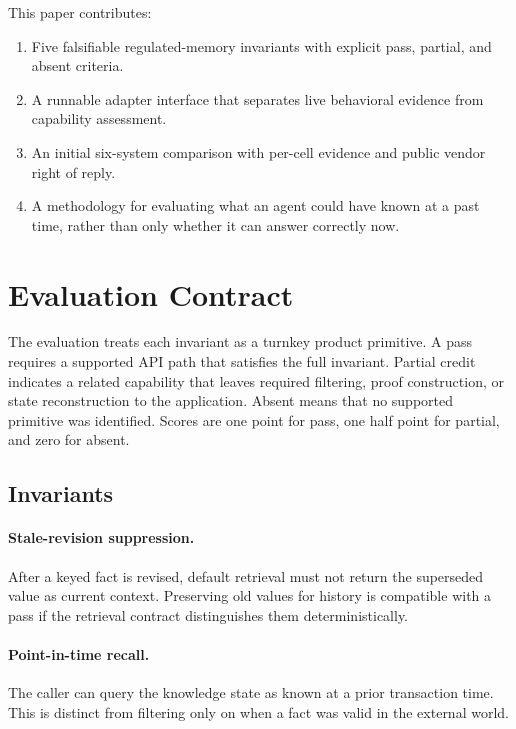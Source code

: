 \documentclass[10pt]{article}
\begin{document}
This paper contributes:

\begin{enumerate}
  \item Five falsifiable regulated-memory invariants with explicit pass, partial,
        and absent criteria.
  \item A runnable adapter interface that separates live behavioral evidence from
        capability assessment.
  \item An initial six-system comparison with per-cell evidence and public vendor
        right of reply.
  \item A methodology for evaluating what an agent could have known at a past time,
        rather than only whether it can answer correctly now.
\end{enumerate}

\section{Evaluation Contract}

The evaluation treats each invariant as a turnkey product primitive. A pass requires
a supported API path that satisfies the full invariant. Partial credit indicates a
related capability that leaves required filtering, proof construction, or state
reconstruction to the application. Absent means that no supported primitive was
identified. Scores are one point for pass, one half point for partial, and zero for
absent.

\subsection{Invariants}

\paragraph{Stale-revision suppression.}
After a keyed fact is revised, default retrieval must not return the superseded value
as current context. Preserving old values for history is compatible with a pass if
the retrieval contract distinguishes them deterministically.

\paragraph{Point-in-time recall.}
The caller can query the knowledge state as known at a prior transaction time. This
is distinct from filtering only on when a fact was valid in the external world.
\end{document}
